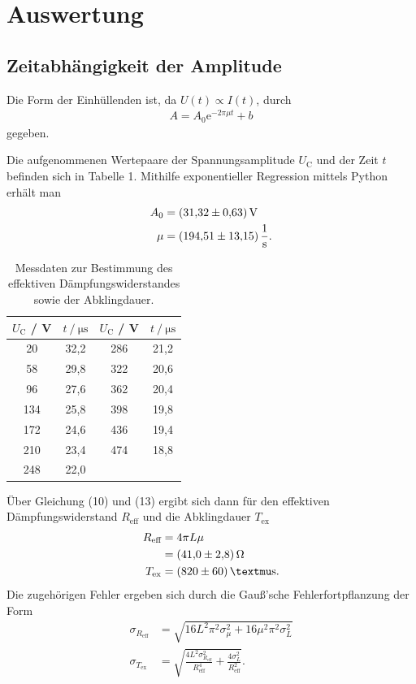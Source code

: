 \section{Auswertung}
\label{sec:Auswertung}

\subsection{Zeitabhängigkeit der Amplitude}

Die Form der Einhüllenden ist, da $\mathit{U(t) \propto I(t)}$, durch
\begin{align*}
A = A_\text{0} \mathrm{e}^{-2 \pi \mu t} + b
\end{align*}
gegeben.


Die aufgenommenen Wertepaare der Spannungsamplitude $U_\text{C}$ und der Zeit $t$
befinden sich in Tabelle 1. Mithilfe exponentieller Regression mittels Python erhält man
\begin{align*}
A_\text{0} &= (\num{31,32 +- 0,63})\,\mathrm{V} \\
\mu &= (\num{194.51 +- 13.15})\,\mathrm{\frac{1}{s}} .
\end{align*}

\begin{table}[H]
\centering
\caption{Messdaten zur Bestimmung des effektiven Dämpfungswiderstandes sowie der Abklingdauer.}
\label{tab:some_data}
\begin{tabular}{c c c c}
\toprule
$U_\text{C}$ \:/\: V & $t \:/\: \si{\micro\second}$ & $U_\text{C}$ \:/\: V & $t \:/\: \si{\micro\second}$\\
\midrule
20  & 32,2 & 286 & 21,2\\
58  & 29,8 & 322 & 20,6\\
96  & 27,6 & 362 & 20,4\\
134 & 25,8 & 398 & 19,8\\
172 & 24,6 & 436 & 19,4\\
210 & 23,4 & 474 & 18,8\\
248 & 22,0 \\
\bottomrule
\end{tabular}
\end{table}

Über Gleichung (10) und (13) ergibt sich dann für den effektiven Dämpfungswiderstand
$R_\text{eff}$ und die Abklingdauer $T_\text{ex}$ 
\begin{align*}
R_\text{eff} &= 4 \pi L \mu\\
       &= (\num{41.0 +- 2.8})\,\si{\ohm}\\
T_\text{ex} &= (\num{820 +- 60})\,\mathrm{µs}.
\end{align*}
Die zugehörigen Fehler ergeben sich durch die Gauß'sche Fehlerfortpflanzung der Form
\begin{align*}
\sigma_{R_\text{eff}} &= \sqrt{ 16 L^{2} \pi^{2} \sigma_{\mu}^{2} + 16 \mu^{2} \pi^{2} \sigma_{L}^{2}} \\
\sigma_{T_\text{ex}} &= \sqrt{\frac{4 L^{2} \sigma_{R_\text{eff}}^{2}}{R_\text{eff}^{4}} + \frac{4 \sigma_{L}^{2}}{R_\text{eff}^{2}}}.
\end{align*}

